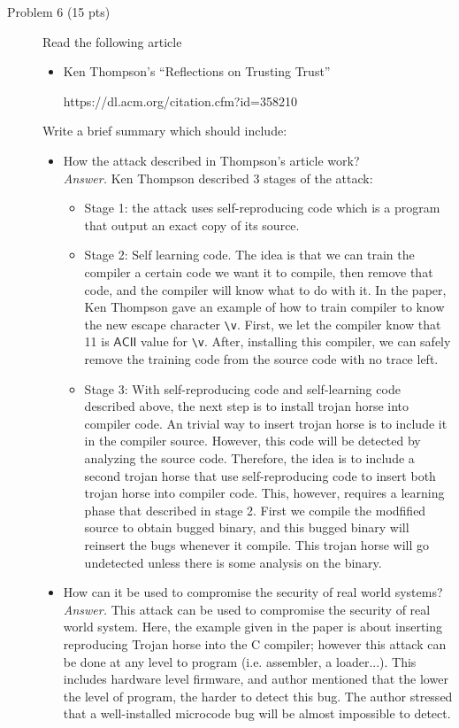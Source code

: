 \documentclass[11pt]{article}
\begin{document}
\begin{description}
 \item[Problem 6 (15 pts) ]
Read the following article
\begin{itemize}
 \item
Ken Thompson's ``Reflections on Trusting Trust'' 

https://dl.acm.org/citation.cfm?id=358210
\end{itemize}

Write a brief summary which should include: 
 
\begin{itemize}
	\item How the attack described in Thompson's article work? 
	\\\textit{Answer. }
	Ken Thompson described 3 stages of the attack:
	\begin{itemize}
		\item Stage 1: the attack uses self-reproducing code which is a program that output an exact copy of its source. 
		\item Stage 2: Self learning code. The idea is that we can train the compiler a certain code we want it to compile, then remove that code, and the compiler will know what to do with it. In the paper, Ken Thompson gave an example of how to train compiler to know the new escape character {\tt\textbackslash v}. First, we let the compiler know that 11 is $\mathsf{ACII}$ value for {\tt \textbackslash v}. After, installing this compiler, we can safely remove the training code from the source code with no trace left. 
		\item Stage 3:  With self-reproducing code and self-learning code described above, the next step is to install trojan horse into compiler code. An trivial way to insert trojan horse is to include it in the compiler source. However, this code will be detected by analyzing the source code. Therefore, the idea is to include a second trojan horse that use self-reproducing code to insert both trojan horse into compiler code. This, however, requires a learning phase that described in stage 2. First we compile the modfified source to obtain bugged binary, and this bugged binary will reinsert the bugs whenever it compile. This trojan horse will go undetected unless there is some analysis on the binary.
	\end{itemize}
	\item How can it be used to compromise the security of real world systems? 
	\\\textit{Answer. }
	This attack can be used to compromise the security of real world system. Here, the example given in the paper is about inserting reproducing Trojan horse into the C compiler; however this attack can be done at any level to program (i.e.  assembler, a loader...). This includes hardware level firmware, and author mentioned that the lower the level of program, the harder to detect this bug. The author stressed that a well-installed microcode bug will be almost impossible to detect.

\end{itemize}
\end{description}
\end{document}
